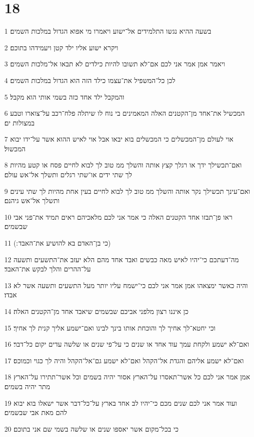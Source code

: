 \chapter{18}

\par 1 בשעה ההיא נגשו התלמידים אל־ישוע ויאמרו מי אפוא הגדול במלכות השמים׃
\par 2 ויקרא ישוע אליו ילד קטן ויעמידהו בתוכם׃
\par 3 ויאמר אמן אמר אני לכם אם־לא תשובו להיות כילדים לא תבאו אל־מלכות השמים׃
\par 4 לכן כל־המשפיל את־עצמו כילד הזה הוא הגדול במלכות השמים׃
\par 5 והמקבל ילד אחד כזה בשמי אותי הוא מקבל׃
\par 6 המכשיל את־אחד מן־הקטנים האלה המאמינים בי נוח לו שיתלה פלח־רכב על־צוארו וטבע במצולות ים׃
\par 7 אוי לעולם מן־המכשלים כי המכשלים בוא יבאו אבל אוי לאיש ההוא אשר על־ידו יבוא המכשול׃
\par 8 ואם־תכשילך ידך או רגלך קצץ אותה והשלך ממ טוב לך לבוא לחיים פסח או קטע מהיות לך שתי ידים או־שתי רגלים ותשלך אל־אש עולם׃
\par 9 ואם־עינך תכשילך נקר אותה והשלך ממ טוב לך לבוא לחיים בעין אחת מהיות לך שתי עינים ותשלך אל־אש גיהנם׃
\par 10 ראו פן־תבזו אחד הקטנים האלה כי אמר אני לכם מלאכיהם ראים תמיד את־פני אבי שבשמים׃
\par 11 (כי בן־האדם בא להושיע את־האבד ׃)
\par 12 מה־דעתכם כי־יהיו לאיש מאה כבשים ואבד אחד מהם הלא יעזב את־התשעים ותשעה על־ההרים והלך לבקש את־האבד׃
\par 13 והיה כאשר ימצאהו אמן אמר אני לכם כי־ישמח עליו יותר מעל התשעים ותשעה אשר לא אבדו׃
\par 14 כן איננו רצון מלפני אביכם שבשמים שיאבד אחד מן־הקטנים האלה׃
\par 15 וכי יחטא־לך אחיך לך והוכחת אותו בינך לבינו ואם־ישמע אליך קנית לך אחיך׃
\par 16 ואם־לא ישמע ולקחת עמך עוד אחד או שנים כי על־פי שנים או שלשה עדים יקום כל־דבר׃
\par 17 ואם־לא ישמע אליהם והגדת אל־הקהל ואם־לא ישמע גם־אל־הקהל והיה לך כגוי וכמוכס׃
\par 18 אמן אמר אני לכם כל אשר־תאסרו על־הארץ אסור יהיה בשמים וכל אשר־תתירו על־הארץ מתר יהיה בשמים׃
\par 19 ועוד אמר אני לכם שנים מכם כי־יהיו לב אחד בארץ על־כל־דבר אשר ישאלו בוא יבוא להם מאת אבי שבשמים׃
\par 20 כי בכל־מקום אשר יאספו שנים או שלשה בשמי שם אני בתוכם׃
